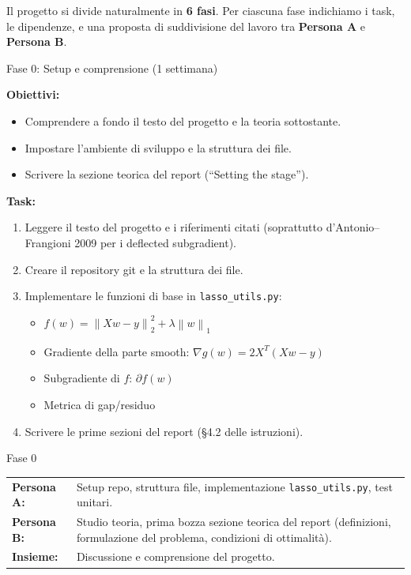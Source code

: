 \documentclass[a4paper,11pt]{article}
\newcommand{\norm}[1]{\left\lVert #1 \right\rVert}
\begin{document}
Il progetto si divide naturalmente in \textbf{6 fasi}. Per ciascuna fase indichiamo i task, le dipendenze, e una proposta di suddivisione del lavoro tra \textbf{Persona A} e \textbf{Persona B}.

\begin{phasebox}{Fase 0: Setup e comprensione (1 settimana)}

\textbf{Obiettivi:}
\begin{itemize}[nosep]
  \item Comprendere a fondo il testo del progetto e la teoria sottostante.
  \item Impostare l'ambiente di sviluppo e la struttura dei file.
  \item Scrivere la sezione teorica del report (``Setting the stage'').
\end{itemize}

\textbf{Task:}
\begin{enumerate}[nosep]
  \item Leggere il testo del progetto e i riferimenti citati (soprattutto d'Antonio--Frangioni 2009 per i deflected subgradient).
  \item Creare il repository git e la struttura dei file.
  \item Implementare le funzioni di base in \texttt{lasso\_utils.py}:
  \begin{itemize}[nosep]
    \item $f(w) = \norm{Xw - y}_2^2 + \lambda\norm{w}_1$
    \item Gradiente della parte smooth: $\nabla g(w) = 2X^T(Xw - y)$
    \item Subgradiente di $f$: $\partial f(w)$
    \item Metrica di gap/residuo
  \end{itemize}
  \item Scrivere le prime sezioni del report (\S 4.2 delle istruzioni).
\end{enumerate}

\begin{splitbox}{Fase 0}
\begin{tabularx}{\textwidth}{lX}
\textbf{Persona A:} & Setup repo, struttura file, implementazione \texttt{lasso\_utils.py}, test unitari. \\
\textbf{Persona B:} & Studio teoria, prima bozza sezione teorica del report (definizioni, formulazione del problema, condizioni di ottimalità). \\
\textbf{Insieme:} & Discussione e comprensione del progetto.
\end{tabularx}
\end{splitbox}
\end{phasebox}
\end{document}
